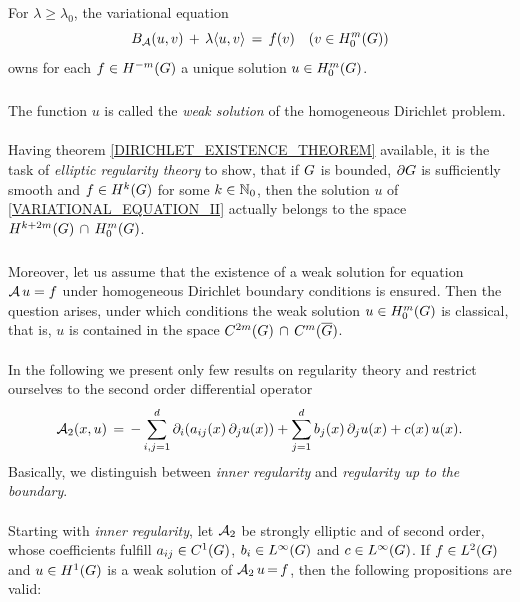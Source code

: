 \documentclass[11pt,twoside]{article}
\begin{document}
\begin{theorem}\label{DIRICHLET_EXISTENCE_THEOREM}
For $\lambda \geq \lambda_0$, the variational equation
\begin{equation}\label{VARIATIONAL_EQUATION_II}
B_{{\mathcal{A}}}(u,v) \, + \, \lambda \langle u,v \rangle
\, = \, f(v) \quad (v \in H_0^{m}(G))
\end{equation}
owns for each $f \in H^{-m}(G)$
a unique solution $u \in H_0^{m}(G)$.
\end{theorem}

\subparagraph*{} %
The function $u$ is called the \textit{weak solution}
of the homogeneous Dirichlet problem.

\paragraph*{} %
Having theorem \ref{DIRICHLET_EXISTENCE_THEOREM} available,
it is the task of \textit{elliptic regularity theory} to show,
that if $G$ is bounded,
$\partial G$ is sufficiently smooth
and $f \in H^k(G)$ for some $k \in {\mathbb{N}}_0$,
then the solution $u$ of \eqref{VARIATIONAL_EQUATION_II}
actually belongs to the space
$H^{k+2m}(G) \, \cap \, H_0^{m}(G)$.

\subparagraph*{}
Moreover,
let us assume
that the existence of a weak solution
for equation ${\mathcal{A}}\,u=f$
under homogeneous Dirichlet boundary conditions is ensured.
Then the question arises,
under which conditions the weak solution $u \in H_0^{m}(G)$
is classical,
that is,
$u$ is contained in the space $C^{2m}(G) \, \cap \, C^m(\overline{G})$.

\paragraph*{}
In the following
we present only few results on regularity theory
and restrict ourselves to the second order differential operator
\[
{\mathcal{A}}_2(x,u) \,=\,
- \sum_{i,j=1}^d \partial_i (a_{ij}(x) \, \partial_j u(x))
+
\sum_{j=1}^d b_j(x) \, \partial_j u(x)
+
c(x) \,u(x).
\]
Basically,
we distinguish between
\textit{inner regularity} and \textit{regularity up to the boundary}.

\paragraph*{} %
Starting with \textit{inner regularity},
let ${\mathcal{A}}_2$ be strongly elliptic and of second order,
whose coefficients fulfill
$a_{ij} \in C^1(G)$, $b_i \in L^{\infty}(G)$ and $c \in L^{\infty}(G)$.
If $f \in L^2(G)$ and $u \in H^1(G)$ is a weak solution of ${\mathcal{A}}_2 \, u {\,=\,} f$,
then the following propositions are valid:
\end{document}
